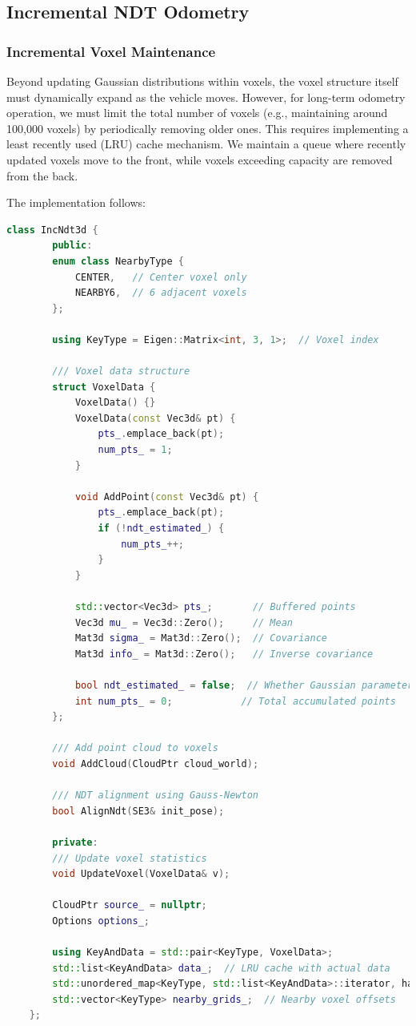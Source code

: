 \subsection{Incremental NDT Odometry}
\label{sec:inc-ndt}
\subsubsection{Incremental Voxel Maintenance}
Beyond updating Gaussian distributions within voxels, the voxel structure itself must dynamically expand as the vehicle moves. However, for long-term odometry operation, we must limit the total number of voxels (e.g., maintaining around 100,000 voxels) by periodically removing older ones. This requires implementing a least recently used (LRU) cache mechanism. We maintain a queue where recently updated voxels move to the front, while voxels exceeding capacity are removed from the back.

The implementation follows:

\begin{lstlisting}[language=c++,caption=src/ch7/ndt_inc.h]
	class IncNdt3d {
		public:
		enum class NearbyType {
			CENTER,   // Center voxel only
			NEARBY6,  // 6 adjacent voxels
		};
		
		using KeyType = Eigen::Matrix<int, 3, 1>;  // Voxel index
		
		/// Voxel data structure
		struct VoxelData {
			VoxelData() {}
			VoxelData(const Vec3d& pt) {
				pts_.emplace_back(pt);
				num_pts_ = 1;
			}
			
			void AddPoint(const Vec3d& pt) {
				pts_.emplace_back(pt);
				if (!ndt_estimated_) {
					num_pts_++;
				}
			}
			
			std::vector<Vec3d> pts_;       // Buffered points
			Vec3d mu_ = Vec3d::Zero();     // Mean
			Mat3d sigma_ = Mat3d::Zero();  // Covariance
			Mat3d info_ = Mat3d::Zero();   // Inverse covariance
			
			bool ndt_estimated_ = false;  // Whether Gaussian parameters are estimated
			int num_pts_ = 0;            // Total accumulated points
		};
		
		/// Add point cloud to voxels
		void AddCloud(CloudPtr cloud_world);
		
		/// NDT alignment using Gauss-Newton
		bool AlignNdt(SE3& init_pose);
		
		private:
		/// Update voxel statistics
		void UpdateVoxel(VoxelData& v);
		
		CloudPtr source_ = nullptr;
		Options options_;
		
		using KeyAndData = std::pair<KeyType, VoxelData>;
		std::list<KeyAndData> data_;  // LRU cache with actual data
		std::unordered_map<KeyType, std::list<KeyAndData>::iterator, hash_vec<3>> grids_;  // Hashmap for fast lookup
		std::vector<KeyType> nearby_grids_;  // Nearby voxel offsets
	};
\end{lstlisting}


